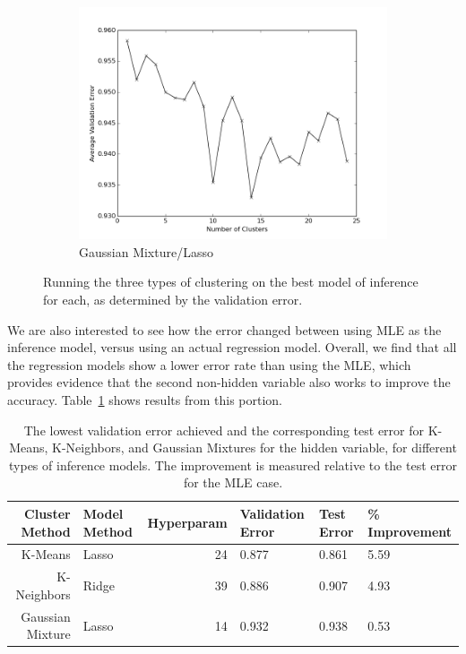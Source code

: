 \documentclass[11pt]{article}
\begin{document}
\begin{figure}[h!]
\begin{subfigure}[h!]{0.33\textwidth}
        \includegraphics[width=\textwidth]{GM_lasso.png}
        \caption{Gaussian Mixture/Lasso}
        \label{fig:gmBEST}
    \end{subfigure}
    \caption{Running the three types of clustering on the best model of inference for each, as determined by the validation error.}
    \label{fig:BEST}
\end{figure}

We are also interested to see how the error changed between using MLE as the inference model, versus using an actual regression model. Overall, we find that all the regression models show a lower error rate than using the MLE, which provides evidence that the second non-hidden variable also works to improve the accuracy. Table~\ref{tab:improvement} shows results from this portion.

\begin{table}[h!]
    \begin{tabularx}{1.0\textwidth}{| r | X | r | X | X | X |}
        \hline
        Cluster Method & Model Method & Hyperparam & Validation Error & Test Error & \% \mbox{Improvement}\\
        \hline
        K-Means & Lasso & 24 & 0.877 & 0.861 & 5.59 \\
        K-Neighbors & Ridge & 39 & 0.886 & 0.907 & 4.93 \\
        Gaussian Mixture & Lasso & 14 & 0.932 & 0.938 & 0.53 \\
        \hline
    \end{tabularx}
    \caption{The lowest validation error achieved and the corresponding test error for K-Means, K-Neighbors, and Gaussian Mixtures for the hidden variable, for different types of inference models. The improvement is measured relative to the test error for the MLE case.}
    \label{tab:improvement}
\end{table}
\end{document}
